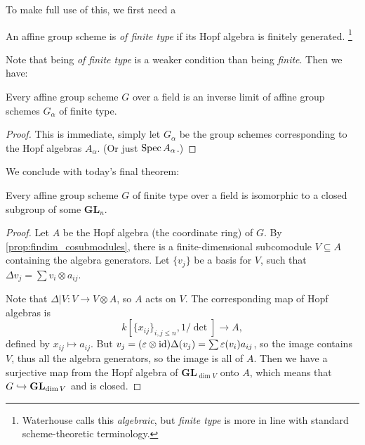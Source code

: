\documentclass{memoir}
\begin{document}
To make full use of this, we first need a 
\begin{definition}\label{def:finite_type}
	An affine group scheme is \emph{of finite type} if its Hopf algebra is finitely generated. \footnote{Waterhouse calls this \emph{algebraic}, but \emph{finite type} is more in line with standard scheme-theoretic terminology.}
\end{definition}
Note that being \emph{of finite type} is a weaker condition than being \emph{finite}.
Then we have:
\begin{corollary}\label{cor:finite_type_is_inverse_limit}
	Every affine group scheme $ G $ over a field is an inverse limit of affine group schemes $ G_\alpha $ of finite type.
\end{corollary}

\begin{proof}
	This is immediate, simply let $ G_\alpha $ be the group schemes corresponding to the Hopf algebras $ A_\alpha $. (Or just $ \operatorname{Spec} A_\alpha $.)
\end{proof}

We conclude with today's final theorem:
\begin{theorem}\label{thm:everything_in_GL}
	Every affine group scheme $ G $ of finite type over a field is isomorphic to a closed subgroup of some $ \mathbf{GL}_n $.
\end{theorem}
\begin{proof}
 Let $ A $ be the Hopf algebra (the coordinate ring) of $ G $. By \cref{prop:findim_cosubmodules}, there is a finite-dimensional subcomodule $ V \subseteq A  $ containing the algebra generators. Let $ \{v_j\} $ be a basis for $ V $, such that $ \Delta v_j=\sum v_i\otimes a_{ij} $.
 
 Note that $ \Delta|V\colon V\to V\otimes A $, so $ A $ acts on $ V $. The corresponding map of Hopf algebras is 
 \[ k[\{x_{ij}\}_{i,j\le n}, {1}/{\det}]\to A, \]
 defined by $ x_{ij}\mapsto a_{ij} $.
 But $ v_j =(\varepsilon\otimes\operatorname{id})\Delta(v_j)=\sum\varepsilon(v_i)a_{ij} $, so the image contains $ V $, thus all the algebra generators, so the image is all of $ A $. Then we have a surjective map from the Hopf algebra of $ \mathbf{GL}_{\dim V} $ onto $ A $, which means that $ G\xhookrightarrow{} \mathbf{GL}_{\dim V} $ and is closed.
\end{proof}
\end{document}
